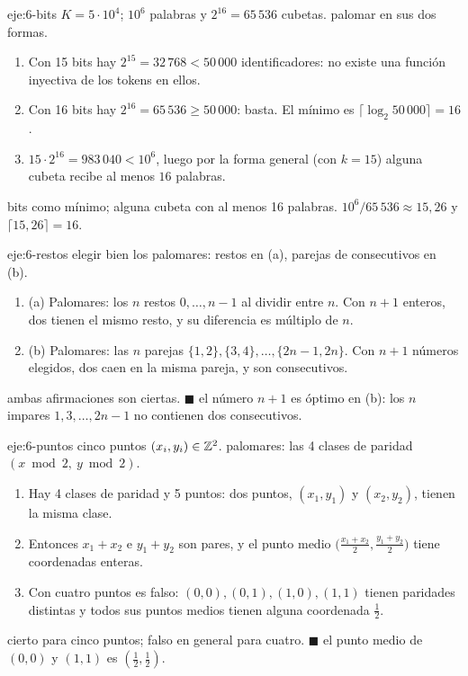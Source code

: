\begin{solucion}{eje:6-bits}
\datos $K=5\cdot10^{4}$; $10^{6}$ palabras y $2^{16}=65\,536$ cubetas.
\planteamiento palomar en sus dos formas.
\pasos
\begin{enumerate}[label=\arabic*.]
  \item Con 15 bits hay $2^{15}=32\,768<50\,000$ identificadores: no existe una función inyectiva de los tokens en ellos.
  \item Con 16 bits hay $2^{16}=65\,536\ge50\,000$: basta. El mínimo es $\lceil\log_2 50\,000\rceil=16$.
  \item $15\cdot2^{16}=983\,040<10^{6}$, luego por la forma general (con $k=15$) alguna cubeta recibe al menos $16$ palabras.
\end{enumerate}
 bits como mínimo; alguna cubeta con al menos 16 palabras.
\comprobacion $10^{6}/65\,536\approx15{,}26$ y $\lceil15{,}26\rceil=16$.
\end{solucion}

\begin{solucion}{eje:6-restos}
\planteamiento elegir bien los palomares: restos en (a), parejas de consecutivos en (b).
\pasos
\begin{enumerate}[label=\arabic*.]
  \item (a) Palomares: los $n$ restos $0,\dots,n-1$ al dividir entre $n$. Con $n+1$ enteros, dos tienen el mismo resto, y su diferencia es múltiplo de $n$.
  \item (b) Palomares: las $n$ parejas $\{1,2\},\{3,4\},\dots,\{2n-1,2n\}$. Con $n+1$ números elegidos, dos caen en la misma pareja, y son consecutivos.
\end{enumerate}
\resultado ambas afirmaciones son ciertas. \hfill$\blacksquare$
\comprobacion el número $n+1$ es óptimo en (b): los $n$ impares $1,3,\dots,2n-1$ no contienen dos consecutivos.
\end{solucion}

\begin{solucion}{eje:6-puntos}
\datos cinco puntos $(x_i,y_i)\in\mathbb{Z}^{2}$.
\planteamiento palomares: las 4 clases de paridad $(x\bmod2,\ y\bmod2)$.
\pasos
\begin{enumerate}[label=\arabic*.]
  \item Hay 4 clases de paridad y 5 puntos: dos puntos, $(x_1,y_1)$ y $(x_2,y_2)$, tienen la misma clase.
  \item Entonces $x_1+x_2$ e $y_1+y_2$ son pares, y el punto medio $\bigl(\tfrac{x_1+x_2}{2},\tfrac{y_1+y_2}{2}\bigr)$ tiene coordenadas enteras.
  \item Con cuatro puntos es falso: $(0,0),(0,1),(1,0),(1,1)$ tienen paridades distintas y todos sus puntos medios tienen alguna coordenada $\tfrac12$.
\end{enumerate}
\resultado cierto para cinco puntos; falso en general para cuatro. \hfill$\blacksquare$
\comprobacion el punto medio de $(0,0)$ y $(1,1)$ es $(\tfrac12,\tfrac12)$.
\end{solucion}

